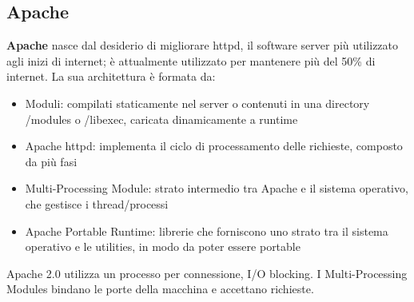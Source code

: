 \documentclass[11pt]{article}
\begin{document}
\subsection{Apache}
\textbf{Apache} nasce dal desiderio di migliorare httpd, il software server più utilizzato agli inizi di internet; è attualmente utilizzato per mantenere più del 50\% di internet. La sua architettura
 è formata da: 
 \begin{itemize}
     \item Moduli: compilati staticamente nel server o contenuti in una directory /modules o /libexec, caricata dinamicamente a runtime
    \item Apache httpd: implementa il ciclo di processamento delle richieste, composto da più fasi
    \item Multi-Processing Module: strato intermedio tra Apache e il sistema operativo, che gestisce i thread/processi
    \item Apache Portable Runtime: librerie che forniscono uno strato tra il sistema operativo e le utilities, in modo da poter essere portable
    \end{itemize}
Apache 2.0 utilizza un processo per connessione, I/O blocking. I Multi-Processing Modules bindano le porte della macchina e accettano richieste. 
\end{document}
